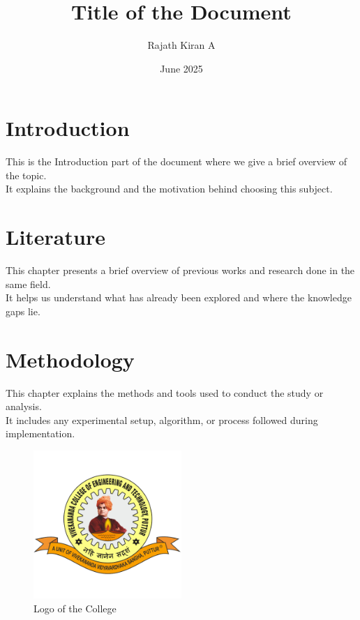 \documentclass{report}
\title{Title of the Document}
\author{Rajath Kiran A}
\date{June 2025}
\begin{document}
	\maketitle
	\tableofcontents
	
	\listoffigures
	
	\listoftables
	
	\chapter{Introduction}
	This is the Introduction part of the document where we give a brief overview of the topic.\cite{berry2001introduction} \\
	It explains the background and the motivation behind choosing this subject.
	
	\chapter{Literature}
	This chapter presents a brief overview of previous works and research done in the same field. \\
	It helps us understand what has already been explored and where the knowledge gaps lie.
	
	\chapter{Methodology}
	This chapter explains the methods and tools used to conduct the study or analysis. \\
	It includes any experimental setup, algorithm, or process followed during implementation.
	\begin{figure}[h]
		\centering\includegraphics[width=0.5\textwidth]{vcet_logo.png}
		\caption{Logo of the College}
		\label{Fig:Image}
	\end{figure}
	
\end{document}
